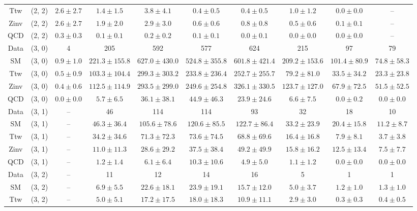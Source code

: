 \begin{table}[h!]
{\begin{tabular}{cccccccccc}
	Ttw & (2, 2) & $2.6\pm 2.7$ & $1.4\pm 1.5$ & $3.8\pm 4.1$ & $0.4\pm 0.5$ & $0.4\pm 0.5$ & $1.0\pm 1.2$ & $0.0\pm 0.0$ & -- \\[0.5ex] 
	Zinv & (2, 2) & $2.6\pm 2.7$ & $1.9\pm 2.0$ & $2.9\pm 3.0$ & $0.6\pm 0.6$ & $0.8\pm 0.8$ & $0.5\pm 0.6$ & $0.1\pm 0.1$ & -- \\[0.5ex] 
	QCD & (2, 2) & $0.3\pm 0.3$ & $0.1\pm 0.1$ & $0.2\pm 0.2$ & $0.1\pm 0.1$ & $0.0\pm 0.1$ & $0.0\pm 0.0$ & $0.0\pm 0.0$ & -- \\[0.5ex] 
	Data & (3, 0) & 4 & 205 & 592 & 577 & 624 & 215 & 97 & 79 \\[0.5ex] 
	SM & (3, 0) & $0.9\pm 1.0$ & $221.3\pm 155.8$ & $627.0\pm 430.0$ & $524.8\pm 355.8$ & $601.8\pm 421.4$ & $209.2\pm 153.6$ & $101.4\pm 80.9$ & $74.8\pm 58.3$ \\[0.5ex] 
	Ttw & (3, 0) & $0.5\pm 0.9$ & $103.3\pm 104.4$ & $299.3\pm 303.2$ & $233.8\pm 236.4$ & $252.7\pm 255.7$ & $79.2\pm 81.0$ & $33.5\pm 34.2$ & $23.3\pm 23.8$ \\[0.5ex] 
	Zinv & (3, 0) & $0.4\pm 0.6$ & $112.5\pm 114.9$ & $293.5\pm 299.0$ & $249.6\pm 254.8$ & $326.1\pm 330.5$ & $123.7\pm 127.0$ & $67.9\pm 72.5$ & $51.5\pm 52.5$ \\[0.5ex] 
	QCD & (3, 0) & $0.0\pm 0.0$ & $5.7\pm 6.5$ & $36.1\pm 38.1$ & $44.9\pm 46.3$ & $23.9\pm 24.6$ & $6.6\pm 7.5$ & $0.0\pm 0.2$ & $0.0\pm 0.0$ \\[0.5ex] 
	Data & (3, 1) & -- & 46 & 114 & 114 & 93 & 32 & 18 & 10 \\[0.5ex] 
	SM & (3, 1) & -- & $46.3\pm 36.4$ & $105.6\pm 78.6$ & $120.6\pm 85.5$ & $122.7\pm 86.4$ & $33.2\pm 23.9$ & $20.4\pm 15.8$ & $11.2\pm 8.7$ \\[0.5ex] 
	Ttw & (3, 1) & -- & $34.2\pm 34.6$ & $71.3\pm 72.3$ & $73.6\pm 74.5$ & $68.8\pm 69.6$ & $16.4\pm 16.8$ & $7.9\pm 8.1$ & $3.7\pm 3.8$ \\[0.5ex] 
	Zinv & (3, 1) & -- & $11.0\pm 11.3$ & $28.6\pm 29.2$ & $37.5\pm 38.4$ & $49.2\pm 49.9$ & $15.8\pm 16.2$ & $12.5\pm 13.4$ & $7.5\pm 7.7$ \\[0.5ex] 
	QCD & (3, 1) & -- & $1.2\pm 1.4$ & $6.1\pm 6.4$ & $10.3\pm 10.6$ & $4.9\pm 5.0$ & $1.1\pm 1.2$ & $0.0\pm 0.0$ & $0.0\pm 0.0$ \\[0.5ex] 
	Data & (3, 2) & -- & 11 & 12 & 14 & 16 & 5 & 1 & 1 \\[0.5ex] 
	SM & (3, 2) & -- & $6.9\pm 5.5$ & $22.6\pm 18.1$ & $23.9\pm 19.1$ & $15.7\pm 12.0$ & $5.0\pm 3.7$ & $1.2\pm 1.0$ & $1.3\pm 1.0$ \\[0.5ex] 
	Ttw & (3, 2) & -- & $5.0\pm 5.1$ & $17.2\pm 17.5$ & $18.0\pm 18.3$ & $10.9\pm 11.1$ & $2.9\pm 3.0$ & $0.3\pm 0.3$ & $0.4\pm 0.5$ \\[0.5ex] 

\end{tabular}}
\end{table}
